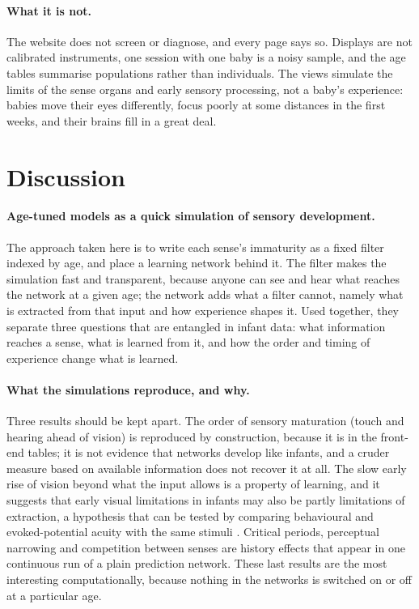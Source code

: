 \documentclass{article}
\begin{document}
\paragraph{What it is not.} The website does not screen or diagnose, and every page says so. Displays are not calibrated instruments, one session with one baby is a noisy sample, and the age tables summarise populations rather than individuals. The views simulate the limits of the sense organs and early sensory processing, not a baby's experience: babies move their eyes differently, focus poorly at some distances in the first weeks, and their brains fill in a great deal.

\section{Discussion}

\paragraph{Age-tuned models as a quick simulation of sensory development.} The approach taken here is to write each sense's immaturity as a fixed filter indexed by age, and place a learning network behind it. The filter makes the simulation fast and transparent, because anyone can see and hear what reaches the network at a given age; the network adds what a filter cannot, namely what is extracted from that input and how experience shapes it. Used together, they separate three questions that are entangled in infant data: what information reaches a sense, what is learned from it, and how the order and timing of experience change what is learned.

\paragraph{What the simulations reproduce, and why.} Three results should be kept apart. The order of sensory maturation (touch and hearing ahead of vision) is reproduced by construction, because it is in the front-end tables; it is not evidence that networks develop like infants, and a cruder measure based on available information does not recover it at all. The slow early rise of vision beyond what the input allows is a property of learning, and it suggests that early visual limitations in infants may also be partly limitations of extraction, a hypothesis that can be tested by comparing behavioural and evoked-potential acuity with the same stimuli \autocite{dobson1978visual}. Critical periods, perceptual narrowing and competition between senses are history effects that appear in one continuous run of a plain prediction network. These last results are the most interesting computationally, because nothing in the networks is switched on or off at a particular age.
\end{document}
